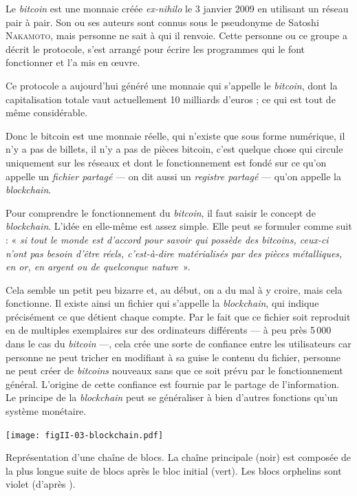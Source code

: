 Le \textit{bitcoin} est une monnaie créée \textit{ex-nihilo} le 3 janvier 2009 en utilisant un réseau pair à pair. Son ou ses auteurs sont connus sous le pseudonyme de Satoshi \textsc{Nakamoto}, mais personne ne sait à qui il renvoie. Cette personne ou ce groupe a décrit le protocole, s'est arrangé pour écrire les programmes qui le font fonctionner et l'a mis en œuvre. 

Ce protocole a aujourd'hui généré une monnaie qui s'appelle le \textit{bitcoin}, dont la capitalisation totale vaut actuellement 10 milliards d'euros ; ce qui est tout de même considérable. 

Donc le bitcoin est une monnaie réelle, qui n'existe que sous forme numérique, il n'y a pas de billets, il n'y a pas de pièces bitcoin, c'est quelque chose qui circule uniquement sur les réseaux et dont le fonctionnement est fondé sur ce qu'on appelle un \emph{fichier partagé} --- on dit aussi un \emph{registre partagé} --- qu'on appelle la \emph{blockchain}.

Pour comprendre le fonctionnement du \textit{bitcoin}, il faut saisir le con\-cept de \textit{blockchain}. L'idée en elle-même est assez simple. Elle peut se formuler comme suit : « \textit{si tout le monde est d'accord pour savoir qui possède des \textup{bitcoins}, ceux-ci n'ont pas besoin d'être réels, c'est-à-dire matérialisés par des pièces métalliques, en or, en argent ou de quelconque nature}~».

Cela semble un petit peu bizarre et, au début, on a du mal à y croire, mais cela fonctionne. Il existe ainsi un fichier qui s'appelle 
la \textit{blockchain}, qui indique précisément ce que détient chaque compte. Par le fait que ce fichier soit reproduit en de multiples exemplaires sur des ordinateurs différents --- à peu près 5\,000 dans le cas du \textit{bitcoin} ---, cela crée une sorte de confiance entre les utilisateurs car personne ne peut tricher en modifiant à sa guise le contenu du fichier, personne ne peut créer de \textit{bitcoins} nouveaux sans que ce soit prévu par le fonctionnement général. L'origine de cette confiance est fournie par le partage de l'information. Le principe de la \textit{blockchain} peut se généraliser à bien d'autres fonctions qu'un système monétaire.

\begin{marginfigure}%
\texttt{[image: figII-03-blockchain.pdf]}
\caption{\label{fig:II.3}Représentation d’une chaî\-ne de blocs. La chaîne principale (noir) est composée de la plus longue suite de blocs après le bloc initial (vert). Les blocs orphelins sont violet (d'après \href{https://fr.wikipedia.org/wiki/Blockchain}{\normalfont\faWikipediaW}).}
\end{marginfigure}


